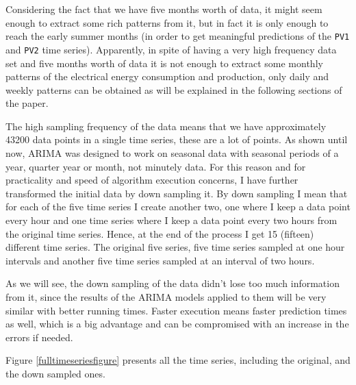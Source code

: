 \documentclass[12pt,a4paper,titlepage]{report}
\begin{document}
Considering the fact that we have five months worth of data, it might seem enough to extract some rich patterns from it, but in fact it is only enough to reach the early summer months (in order to get meaningful predictions of the \texttt{PV1} and \texttt{PV2} time series). Apparently, in spite of having a very high frequency data set and five months worth of data it is not enough to extract some monthly patterns of the electrical energy consumption and production, only daily and weekly patterns can be obtained as will be explained in the following sections of the paper.

The high sampling frequency of the data means that we have approximately 43200 data points in a single time series, these are a lot of points.
As shown until now, ARIMA was designed to work on seasonal data with seasonal periods of a year, quarter year or month, not minutely data.
For this reason and for practicality and speed of algorithm execution concerns, I have further transformed the initial data by down sampling it.
By down sampling I mean that for each of the five time series I create another two, one where I keep a data point every hour and one time series where I keep a data point every two hours from the original time series. Hence, at the end of the process I get 15 (fifteen) different time series.
The original five series, five time series sampled at one hour intervals and another five time series sampled at an interval of two hours.

As we will see, the down sampling of the data didn't lose too much information from it, since the results of the ARIMA models applied to them will be very similar with better running times. Faster execution means faster prediction times as well, which is a big advantage and can be compromised with an increase in the errors if needed.

Figure \ref{fulltimeseriesfigure} presents all the time series, including the original, and the down sampled ones.
\end{document}
